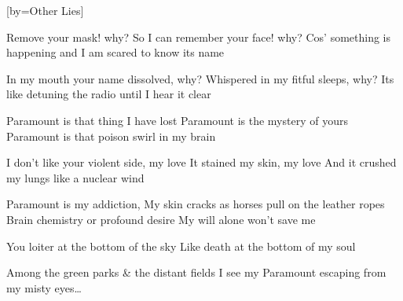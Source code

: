[by={Other Lies}]

  \chordsoff
  \beginverse
  Remove your mask! why?
  So I can remember your face! why?
  Cos’ something is happening
  and I am scared to know its name

  In my mouth your name dissolved, why?
  Whispered in my fitful sleeps, why?
  Its like detuning the radio until I hear it clear 
  \endverse

  
  \beginchorus
  Paramount is that thing I have lost
  Paramount is the mystery of yours
  Paramount is that poison swirl in my brain
  \endchorus

  \beginverse
  I don’t like your violent side, my love
  It stained my skin, my love
  And it crushed my lungs like a nuclear wind
  \endverse

  \beginverse
  Paramount is my addiction,
  My skin cracks as horses pull on the leather ropes
  Brain chemistry or profound desire 
  My will alone won't save me
  \endverse

  \beginverse
  You loiter at the bottom of the sky
  Like death at the bottom of my soul
  \endverse

  \beginchorus
  Among the green parks \& the distant fields
  I see my Paramount escaping from my misty eyes…
  \endchorus
\endsong
